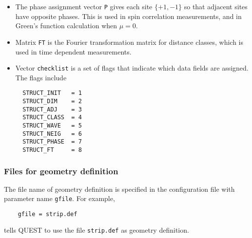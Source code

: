 \documentclass[12pt]{article}
\begin{document}
\begin{itemize}
 \item  The phase assignment vector \verb|P| gives each site $\{+1,-1\}$ so that adjacent sites have opposite phases. This is used in spin correlation measurements, and in Green's function calculation when $\mu=0$.
 \item Matrix \verb|FT| is the Fourier transformation matrix for distance classes, which is used in time dependent measurements.
 \item Vector \verb"checklist" is a set of flags that indicate which data fields are assigned. The flags include
     \begin{verbatim}
  STRUCT_INIT   = 1
  STRUCT_DIM    = 2
  STRUCT_ADJ    = 3
  STRUCT_CLASS  = 4
  STRUCT_WAVE   = 5
  STRUCT_NEIG   = 6
  STRUCT_PHASE  = 7
  STRUCT_FT     = 8
     \end{verbatim}
\end{itemize}

\subsubsection{Files for geometry definition}
The file name of geometry definition is specified in the configuration file with parameter name \verb"gfile". For example,
\begin{verbatim}
    gfile = strip.def
\end{verbatim}
tells QUEST to use the file \verb"strip.def" as geometry definition.
\end{document}
